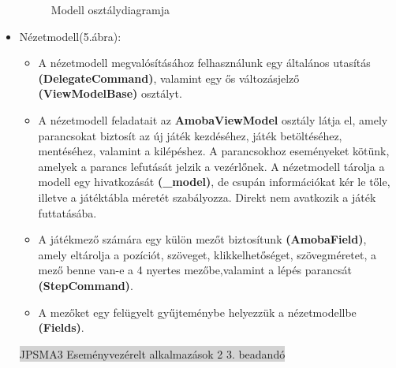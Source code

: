 \documentclass[11pt,a4paper]{article}
\begin{document}
\begin{itemize}
\begin{figure}[h]
		\caption{Modell osztálydiagramja}
	\end{figure}
	\item Nézetmodell(5.ábra):
	\begin{itemize}
		\item A nézetmodell megvalósításához felhasználunk egy általános utasítás
		\textbf{(DelegateCommand)}, valamint egy ős változásjelző \textbf{(ViewModelBase)} osztályt.
		\item A nézetmodell feladatait az \textbf{AmobaViewModel} osztály látja el, amely
		parancsokat biztosít az új játék kezdéséhez, játék betöltéséhez,
		mentéséhez, valamint a kilépéshez. A parancsokhoz eseményeket kötünk,
		amelyek a parancs lefutását jelzik a vezérlőnek. A nézetmodell tárolja a
		modell egy hivatkozását \textbf{(\_model)}, de csupán információkat kér le tőle,
		illetve a játéktábla méretét szabályozza. Direkt nem avatkozik a játék
		futtatásába.
		\item A játékmező számára egy külön mezőt biztosítunk \textbf{(AmobaField)}, amely
		eltárolja a pozíciót, szöveget, klikkelhetőséget, szövegméretet, a mező benne van-e a
		4 nyertes mezőbe,\br valamint a lépés parancsát \textbf{(StepCommand)}.
		\item A mezőket egy felügyelt gyűjteménybe helyezzük a nézetmodellbe \textbf{(Fields)}.
	\end{itemize}
	\newpage
	\thispagestyle{empty}
	\begin{center}
		\colorbox{lightgray}{{\large JPSMA3} \hspace{3cm} {\large Eseményvezérelt alkalmazások 2 3. beadandó} \hspace{5cm} \thepage}
	\end{center}
	\begin{figure}[h]
		\centering

\end{figure}
\end{itemize}
\end{document}
